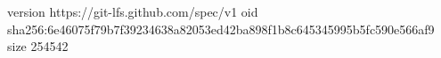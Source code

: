 version https://git-lfs.github.com/spec/v1
oid sha256:6e46075f79b7f39234638a82053ed42ba898f1b8c645345995b5fc590e566af9
size 254542
